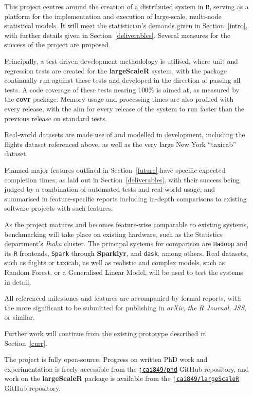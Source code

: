 This project centres around the creation of a distributed system in \texttt{R}, serving as a platform for the implementation and execution of large-scale, multi-node statistical models.
It will meet the statistician's demands given in Section~\ref{intro}, with further details given in Section~\ref{deliverables}.
Several measures for the success of the project are proposed.

Principally, a test-driven development methodology is utilised, where unit and regression tests are created for the \textbf{largeScaleR} system, with the package continually run against these tests and developed in the direction of passing all tests.
A code coverage of these tests nearing 100\% is aimed at, as measured by the \textbf{covr} package.
Memory usage and processing times are also profiled with every release, with the aim for every release of the system to run faster than the previous release on standard tests.

Real-world datasets are made use of and modelled in development, including the flights dataset referenced above, as well as the very large New York ``taxicab'' dataset\cite{tlc2021trips}.

Planned major features outlined in Section~\ref{future} have specific expected completion times, as laid out in Section~\ref{deliverables}, with their success being judged by a combination of automated tests and real-world usage, and summarised in feature-specific reports including in-depth comparisons to existing software projects with such features.

As the project matures and becomes feature-wise comparable to existing systems, benchmarking will take place on existing hardware, such as the Statistics department's \textit{Ihaka} cluster. 
The principal systems for comparison are \texttt{Hadoop} and its \texttt{R} frontends, \texttt{Spark} through \textbf{Sparklyr}, and \texttt{dask}, among others.
Real datasets, such as flights or taxicab, as well as realistic and complex models, such as Random Forest, or a Generalised Linear Model, will be used to test the systems in detail.

All referenced milestones and features are accompanied by formal reports, with the more significant to be submitted for publishing in \textit{arXiv}, \textit{the R Journal}, \textit{JSS}, or similar.

Further work will continue from the existing prototype described in Section~\ref{curr}.

The project is fully open-source.
Progress on written PhD work and experimentation is freely accessible from the \href{https://github.com/jcai849/phd}{\texttt{jcai849/phd}} GitHub repository, and work on the \textbf{largeScaleR} package is available from the \href{https://github.com/jcai849/phd}{\texttt{jcai849/largeScaleR}} GitHub repository\cite{cairns2020largescaler}.
